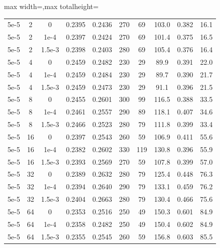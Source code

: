 \begin{table}[p]
\begin{adjustbox}{max width=\textwidth,max totalheight=\textheight}
\begin{tabular}{cccccccccc}
5e-5 &2&0      &0.2395&0.2436&270&69 &103.0&0.382&16.1\\
5e-5 &2&1e-4   &0.2397&0.2424&270&69 &101.4&0.375&16.5\\
5e-5 &2&1.5e-3 &0.2398&0.2403&280&69 &105.4&0.376&16.4\\
5e-5 &4&0      &0.2459&0.2482&230&29 &89.9 &0.391&22.0\\
5e-5 &4&1e-4   &0.2459&0.2484&230&29 &89.7 &0.390&21.7\\
5e-5 &4&1.5e-3 &0.2459&0.2473&230&29 &91.1 &0.396&21.5\\
5e-5 &8&0      &0.2455&0.2601&300&99 &116.5&0.388&33.5\\
5e-5 &8&1e-4   &0.2461&0.2557&290&89 &118.1&0.407&34.6\\
5e-5 &8&1.5e-3 &0.2466&0.2523&280&79 &111.8&0.399&33.4\\
5e-5 &16&0     &0.2397&0.2543&260&59 &106.9&0.411&55.6\\
5e-5 &16&1e-4  &0.2382&0.2602&330&119&130.8&0.396&55.9\\
5e-5 &16&1.5e-3&0.2393&0.2569&270&59 &107.8&0.399&57.0\\
5e-5 &32&0     &0.2389&0.2632&280&79 &125.4&0.448&76.3\\
5e-5 &32&1e-4  &0.2394&0.2640&290&79 &133.1&0.459&76.2\\
5e-5 &32&1.5e-3&0.2404&0.2663&280&79 &130.4&0.466&75.6\\
5e-5 &64&0     &0.2353&0.2516&250&49 &150.3&0.601&84.9\\
5e-5 &64&1e-4  &0.2358&0.2482&250&49 &150.4&0.602&84.9\\
5e-5 &64&1.5e-3&0.2355&0.2545&260&59 &156.8&0.603&85.5\\


\end{tabular}
\end{adjustbox}
\end{table}
